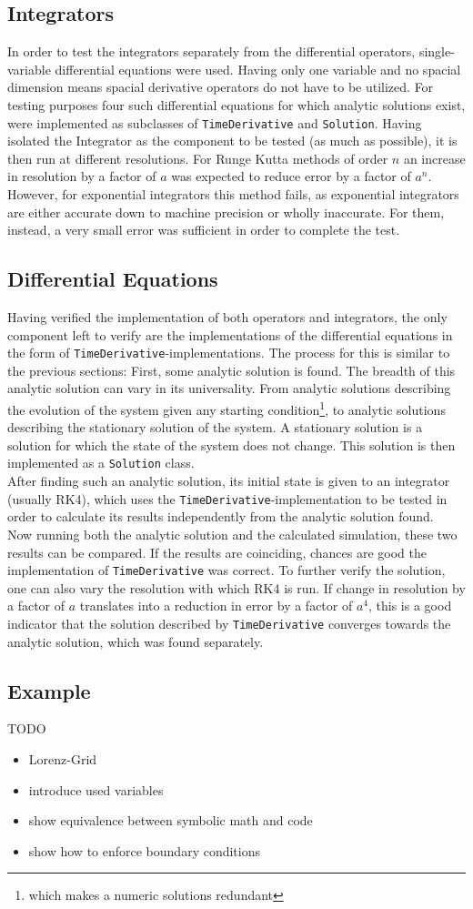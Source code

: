 \subsection{Integrators}
In order to test the integrators separately from the differential operators, single-variable differential equations were used.
Having only one variable and no spacial dimension means spacial derivative operators do not have to be utilized.
For testing purposes four such differential equations for which analytic solutions exist, were implemented as subclasses of  \texttt{TimeDerivative} and \texttt{Solution}.
Having isolated the Integrator as the component to be tested (as much as possible), it is then run at different resolutions.
For Runge Kutta methods of order $n$ an increase in resolution by a factor of $a$ was expected to reduce error by a factor of $a^n$.
However, for exponential integrators this method fails, as exponential integrators are either accurate down to machine precision or wholly inaccurate.
For them, instead, a very small error was sufficient in order to complete the test.

\subsection{Differential Equations}
Having verified the implementation of both operators and integrators, the only component left to verify are the implementations of the differential equations in the form of \texttt{TimeDerivative}-implementations.
The process for this is similar to the previous sections: First, some analytic solution is found.
The breadth of this analytic solution can vary in its universality.
From analytic solutions describing the evolution of the system given any starting condition\footnote{which makes a numeric solutions redundant}, to analytic solutions describing the stationary solution of the system.
A stationary solution is a solution for which the state of the system does not change.
This solution is then implemented as a \texttt{Solution} class.
\\
After finding such an analytic solution, its initial state is given to an integrator (usually RK4), which uses the \texttt{TimeDerivative}-implementation to be tested in order to calculate its results independently from the analytic solution found.
\\
Now running both the analytic solution and the calculated simulation, these two results can be compared.
If the results are coinciding, chances are good the implementation of \texttt{TimeDerivative} was correct.
To further verify the solution, one can also vary the resolution with which RK4 is run.
If change in resolution by a factor of $a$ translates into a reduction in error by a factor of $a^4$, this is a good indicator that the solution described by \texttt{TimeDerivative} converges towards the analytic solution, which was found separately.

\subsection{Example}
TODO
\begin{itemize}
\item Lorenz-Grid
\item introduce used variables
\item show equivalence between symbolic math and code
\item show how to enforce boundary conditions
\end{itemize}